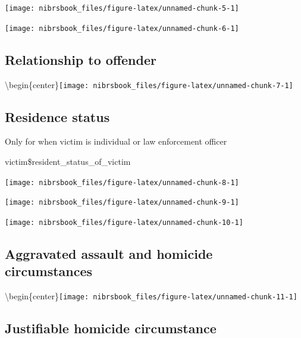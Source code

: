 \documentclass[
  12pt,
  openany]{book}
\begin{document}
\begin{center}\texttt{[image: nibrsbook\_files/figure-latex/unnamed-chunk-5-1]} \end{center}

\begin{center}\texttt{[image: nibrsbook\_files/figure-latex/unnamed-chunk-6-1]} \end{center}

\hypertarget{relationship-to-offender}{%
\subsection{Relationship to offender}\label{relationship-to-offender}}

\textbackslash begin\{center\}\texttt{[image: nibrsbook\_files/figure-latex/unnamed-chunk-7-1]}

\hypertarget{residence-status}{%
\subsection{Residence status}\label{residence-status}}

Only for when victim is individual or law enforcement officer

victim\$resident\_status\_of\_victim

\begin{center}\texttt{[image: nibrsbook\_files/figure-latex/unnamed-chunk-8-1]} \end{center}

\begin{center}\texttt{[image: nibrsbook\_files/figure-latex/unnamed-chunk-9-1]} \end{center}

\begin{center}\texttt{[image: nibrsbook\_files/figure-latex/unnamed-chunk-10-1]} \end{center}

\hypertarget{aggravated-assault-and-homicide-circumstances}{%
\subsection{Aggravated assault and homicide circumstances}\label{aggravated-assault-and-homicide-circumstances}}

\textbackslash begin\{center\}\texttt{[image: nibrsbook\_files/figure-latex/unnamed-chunk-11-1]}

\hypertarget{justifiable-homicide-circumstance}{%
\subsection{Justifiable homicide circumstance}\label{justifiable-homicide-circumstance}}
\end{document}
